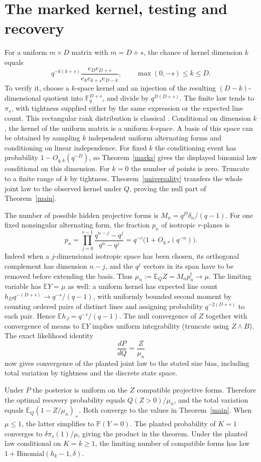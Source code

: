 \documentclass[11pt]{article}
\newcommand{\F}{\mathbb F}
\newcommand{\PP}{\mathbb P}
\newcommand{\E}{\mathbb E}
\newcommand{\defeq}{\mathrel{:=}}
\begin{document}
\section{The marked kernel, testing and recovery}
For a uniform $m\times D$ matrix with $m=D+s$, the chance of kernel dimension $k$ equals
\[
 q^{-k(k+s)}\frac{e_D e_{D+s}}{e_k e_{k+s}e_{D-k}},
 \qquad \max(0,-s)\le k\le D.
\]
To verify it, choose a $k$-space kernel and an injection of the resulting $(D-k)$-dimensional quotient into $\F_q^{D+s}$, and divide by $q^{D(D+s)}$. The finite law tends to $\pi_s$, with tightness supplied either by the same expression or the expected line count. This rectangular rank distribution is classical \cite{fulman}. Conditional on dimension $k$, the kernel of the uniform matrix is a uniform $k$-space. A basis of this space can be obtained by sampling $k$ independent uniform alternating forms and conditioning on linear independence. For fixed $k$ the conditioning event has probability $1-O_{q,k}(q^{-D})$, so Theorem~\ref{marks} gives the displayed binomial law conditional on this dimension. For $k=0$ the number of points is zero. Truncate to a finite range of $k$ by tightness. Theorem~\ref{universality} transfers the whole joint law to the observed kernel under $Q$, proving the null part of Theorem~\ref{main}.

The number of possible hidden projective forms is $M_n=q^D\delta_n/(q-1)$. For one fixed nonsingular alternating form, the fraction $p_n$ of isotropic $r$-planes is
\[
 p_n=\prod_{j=0}^{r-1}\frac{q^{n-j}-q^j}{q^n-q^j}
 =q^{-c}\big(1+O_{q,r}(q^{-n})\big).
\]
Indeed when a $j$-dimensional isotropic space has been chosen, its orthogonal complement has dimension $n-j$, and the $q^j$ vectors in its span have to be removed before extending the basis. Thus $\mu_n\defeq \E_Q Z=M_np_n^t\to\mu$. The limiting variable has $\E Y=\mu$ as well: a uniform kernel has expected line count $h_D q^{-(D+s)}\to q^{-s}/(q-1)$, with uniformly bounded second moment by counting ordered pairs of distinct lines and assigning probability $q^{-2(D+s)}$ to each pair. Hence $\E h_J=q^{-s}/(q-1)$. The null convergence of $Z$ together with convergence of means to $\E Y$ implies uniform integrability (truncate using $Z\wedge B$). The exact likelihood identity
\[
 \frac{dP}{dQ}=\frac{Z}{\mu_n}
\]
now gives convergence of the planted joint law to the stated size bias, including total variation by tightness and the discrete state space.

Under $P$ the posterior is uniform on the $Z$ compatible projective forms. Therefore the optimal recovery probability equals $Q(Z>0)/\mu_n$, and the total variation equals $\E_Q(1-Z/\mu_n)_+$. Both converge to the values in Theorem~\ref{main}. When $\mu\le1$, the latter simplifies to $\PP(Y=0)$. The planted probability of $K=1$ converges to $\delta\pi_s(1)/\mu$, giving the product in the theorem. Under the planted law conditional on $K=k\ge1$, the limiting number of compatible forms has law $1+\mathrm{Binomial}(h_k-1,\delta)$.
\end{document}
